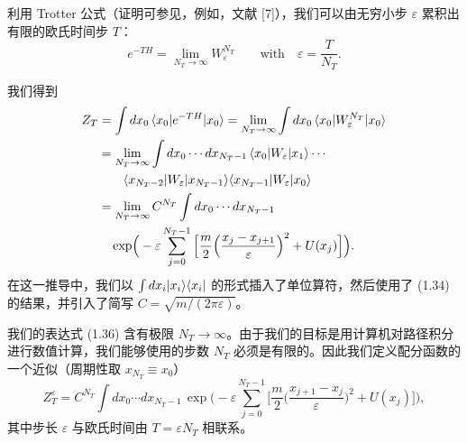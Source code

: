 利用 Trotter 公式（证明可参见，例如，文献 [7]），我们可以由无穷小步 $\varepsilon$ 累积出有限的欧氏时间步 $T$：
\begin{equation}
  e^{-TH} = \lim_{N_T\to\infty} W_\varepsilon^{N_T}
  \qquad \text{with} \quad \varepsilon = \frac{T}{N_T}.
\end{equation}

我们得到
\begin{align}
  Z_T &= \int dx_0\,\langle x_0|e^{-TH}|x_0\rangle
        = \lim_{N_T\to\infty}\int dx_0\,\langle x_0|W_\varepsilon^{N_T}|x_0\rangle \notag\\
      &= \lim_{N_T\to\infty}\int dx_0\cdots dx_{N_T-1}\,
         \langle x_0|W_\varepsilon|x_1\rangle\cdots \notag\\
      &\qquad \langle x_{N_T-2}|W_\varepsilon|x_{N_T-1}\rangle
         \langle x_{N_T-1}|W_\varepsilon|x_0\rangle \notag\\
      &= \lim_{N_T\to\infty} C^{N_T}\int dx_0\cdots dx_{N_T-1}\, \notag\\
      &\quad \exp\!\Big(-\varepsilon\sum_{j=0}^{N_T-1}
           \Big[\frac{m}{2}\Big(\frac{x_j - x_{j+1}}{\varepsilon}\Big)^2 + U(x_j)\Big]\Big).
\end{align}
在这一推导中，我们以 $\int dx_i |x_i\rangle\langle x_i|$ 的形式插入了单位算符，然后使用了 (1.34) 的结果，并引入了简写 $C = \sqrt{m/(2\pi\varepsilon)}$。

我们的表达式 (1.36) 含有极限 $N_T \to \infty$。由于我们的目标是用计算机对路径积分进行数值计算，我们能够使用的步数 $N_T$ 必须是有限的。因此我们定义配分函数的一个近似（周期性取 $x_{N_T} \equiv x_0$）
\begin{equation}
  Z_T^\varepsilon = C^{N_T}\int dx_0\cdots dx_{N_T-1}\,
  \exp\!\Big(-\varepsilon\sum_{j=0}^{N_T-1}
    \Big[\frac{m}{2}\Big(\frac{x_{j+1} - x_j}{\varepsilon}\Big)^2 + U(x_j)\Big]\Big),
\end{equation}
其中步长 $\varepsilon$ 与欧氏时间由 $T = \varepsilon N_T$ 相联系。

